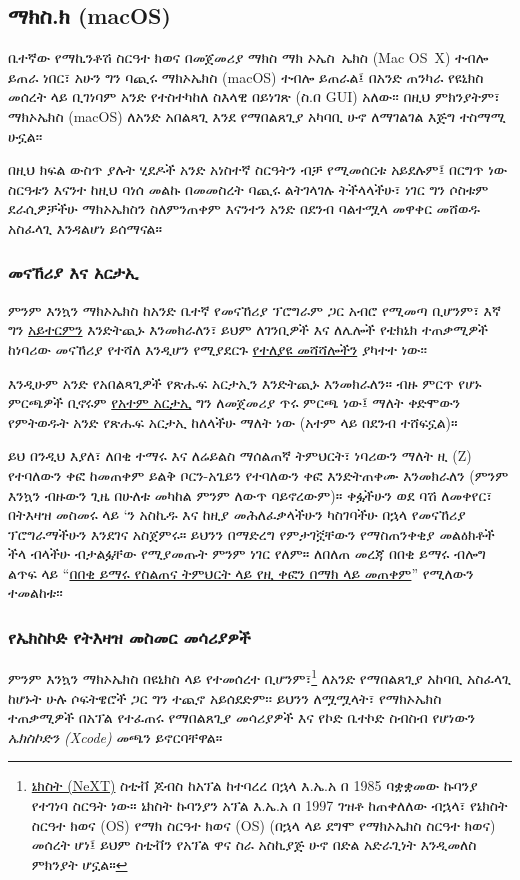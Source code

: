\subsection{ማክስ.ክ (macOS)} %
\label{sec:macos}

ቤተኛው የማኪንቶሽ ስርዓተ ክወና በመጀመሪያ ማክስ ማክ ኦኤስ~ኤክስ (Mac OS~X) ተብሎ ይጠራ ነበር፣ አሁን ግን ባጪሩ ማክኦኤክስ (macOS) ተብሎ ይጠራል፤ በአንድ ጠንካራ የዩኒክስ መሰረት ላይ ቢገነባም አንድ የተስተካከለ ስእላዊ በይነገጽ (ስ.በ GUI) አለው፡፡ በዚህ ምክንያትም፣ ማክኦኤክስ (macOS) ለአንድ አበልጻጊ እንደ የማበልጸጊያ አካባቢ ሁኖ ለማገልገል እጅግ ተስማሚ ሁኗል፡፡

በዚህ ክፍል ውስጥ ያሉት ሂደዶች አንድ አነስተኛ ስርዓትን ብቻ የሚመሰርቱ አይደሉም፤ በርግጥ ነው ስርዓቱን እናንተ ከዚህ ባነሰ መልኩ በመመስረት ባጪሩ ልትገላገሉ ትችላላችሁ፣ ነገር ግን ሶስቱም ደራሲዎቻችሁ ማክኦኤክስን ስለምንጠቀም እናንተን አንድ በደንብ ባልተሟላ መዋቀር መሸወዱ አስፈላጊ እንዳልሆነ ይሰማናል።

\subsubsection{መናኸሪያ እና አርታኢ} %
\label{sec:terminal_and_editor}

ምንም እንኳን ማክኦኤክስ ከአንድ ቤተኛ የመናኸሪያ ፕሮግራም ጋር አብሮ የሚመጣ ቢሆንም፣ እኛ ግን \href{https://www.iterm2.com/downloads.html}{አይተርምን} እንድትጪኑ እንመክራለን፣ ይህም ለገንቢዎች እና ለሌሎች የቴክኒክ ተጠቃሚዎች ከነባሪው መናኸሪያ የተሻለ እንዲሆን የሚያደርጉ \href{https://www.iterm2.com/features.html}{የተለያዩ መሻሻሎችን} ያካተተ ነው፡፡

እንዲሁም አንድ የአበልጻጊዎች የጽሑፍ አርታኢን እንድትጪኑ እንመክራለን። ብዙ ምርጥ የሆኑ ምርጫዎች ቢኖሩም \href{https://atom.io/}{የአተም አርታኢ} ግን ለመጀመሪያ ጥሩ ምርጫ ነው፤ ማለት ቀድሞውን የምትወዱት አንድ የጽሑፍ አርታኢ ከለላችሁ ማለት ነው (አተም  ላይ በደንብ ተሸፍኗል)።

ይህ በንዲህ እያለ፣ ለበቂ ተማሩ እና ለሬይልስ ማሰልጠኛ ትምህርት፣ ነባሪውን ማለት ዚ (Z) የተባለውን ቀፎ ከመጠቀም ይልቅ ቦርን-አጌይን የተባለውን ቀፎ እንድትጠቀሙ እንመክራለን (ምንም እንኳን ብዙውን ጊዜ በሁለቱ መካከል ምንም ለውጥ ባይኖረውም)። ቀፏችሁን ወደ ባሽ ለመቀየር፣ በትእዛዝ መስመሩ ላይ  `ን አስኪዱ እና ከዚያ መሕለፈቃላችሁን ካስገባችሁ በኋላ የመናኸሪያ ፕሮግራማችሁን እንደገና አስጀምሩ። ይህንን በማድረግ የምታገኟቸውን የማስጠንቀቂያ መልዕክቶች ችላ ብላችሁ ብታልፏቸው የሚያመጡት ምንም ነገር የለም። ለበለጠ መረጃ በበቂ ይማሩ ብሎግ ልጥፍ ላይ ``\href{https://news.learnenough.com/macos-bash-zshell}{በበቂ ይማሩ የስልጠና ትምህርት ላይ የዚ ቀፎን በማክ ላይ መጠቀም}'' የሚለውን ተመልከቱ፡፡



\subsubsection{የኤክስኮድ የትእዛዝ መስመር መሳሪያዎች}
\label{sec:shiny_xcode}

ምንም እንኳን ማክኦኤክስ በዩኒክስ ላይ የተመሰረተ ቢሆንም፣\footnote{\href{https://en.wikipedia.org/wiki/NeXT}{ኔክስት (NeXT)} ስቲቭ ጆብስ ከአፕል ከተባረረ በኋላ እ.ኤ.አ በ 1985 ባቋቋመው ኩባንያ የተገነባ ስርዓት ነው። ኔክስት ኩባንያን አፕል እ.ኤ.አ በ 1997 ገዝቶ ከጠቀለለው ብኋላ፣ የኔክስት ስርዓተ ክወና (OS) የማክ ስርዓተ ክወና (OS) (በኋላ ላይ ደግሞ የማክኦኤክስ ስርዓተ ክወና) መሰረት ሆነ፤ ይህም ስቲቭን የአፕል ዋና ስራ አስኪያጅ ሁኖ በድል አድራጊነት እንዲመለስ ምክንያት ሆኗል።} ለአንድ የማበልጸጊያ አከባቢ አስፈላጊ ከሆኑት ሁሉ ሶፍትዌሮች ጋር ግን ተጪኖ አይሰደድም፡፡ ይህንን ለሟሟላት፣ የማክኦኤክስ ተጠቃሚዎች በአፕል የተፈጠሩ የማበልጸጊያ መሳሪያዎች እና የኮድ ቤተኮድ ስብስብ የሆነውን \emph{ኤክስኮድን (Xcode)} መጫን ይኖርባቸዋል።

